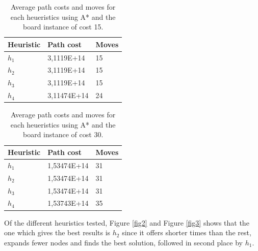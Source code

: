 \documentclass[runningheads]{llncs}
\begin{document}
\begin{table}
    \centering
    \caption{Average path costs and moves for each heueristics using A* and the board instance of cost 15.}\label{tab1}
    \begin{tabular}{|l|l|l|}
    \hline
    Heuristic & Path cost & Moves\\
    \hline
    $h_1$ & 3,1119E+14 & 15\\
    $h_2$ & 3,1119E+14 & 15\\
    $h_3$ & 3,1119E+14 & 15\\
    $h_4$ & 3,11474E+14 & 24\\
    \hline
    \end{tabular}
\end{table}

\begin{table}
    \centering
    \caption{Average path costs and moves for each heueristics using A* and the board instance of cost 30.}\label{tab2}
    \begin{tabular}{|l|l|l|}
    \hline
    Heuristic & Path cost & Moves\\
    \hline
    $h_1$ & 1,53474E+14    & 31\\
    $h_2$ & 1,53474E+14    & 31\\
    $h_3$ & 1,53474E+14    & 31\\
    $h_4$ & 1,53743E+14    & 35\\
    \hline
    \end{tabular}
\end{table}
Of the different heuristics tested, Figure \ref{fig2} and Figure \ref{fig3} shows that the one which gives the best results is $h_2$ since it offers shorter times than the rest,
expands fewer nodes and finds the best solution, followed in second place by $h_1$.
\end{document}
